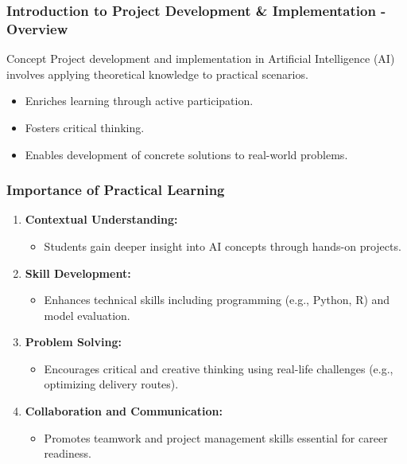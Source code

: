 \documentclass[aspectratio=169]{beamer}
\begin{document}
\frame{\titlepage}

\begin{frame}[fragile]
    \frametitle{Introduction to Project Development \& Implementation - Overview}
    \begin{block}{Concept}
        Project development and implementation in Artificial Intelligence (AI) involves applying theoretical knowledge to practical scenarios.
    \end{block}
    \begin{itemize}
        \item Enriches learning through active participation.
        \item Fosters critical thinking.
        \item Enables development of concrete solutions to real-world problems.
    \end{itemize}
\end{frame}

\begin{frame}[fragile]
    \frametitle{Importance of Practical Learning}
    \begin{enumerate}
        \item \textbf{Contextual Understanding:}
            \begin{itemize}
                \item Students gain deeper insight into AI concepts through hands-on projects.
            \end{itemize}
        \item \textbf{Skill Development:}
            \begin{itemize}
                \item Enhances technical skills including programming (e.g., Python, R) and model evaluation.
            \end{itemize}
        \item \textbf{Problem Solving:}
            \begin{itemize}
                \item Encourages critical and creative thinking using real-life challenges (e.g., optimizing delivery routes).
            \end{itemize}
        \item \textbf{Collaboration and Communication:}
            \begin{itemize}
                \item Promotes teamwork and project management skills essential for career readiness.
            \end{itemize}
    \end{enumerate}
\end{frame}
\end{document}
